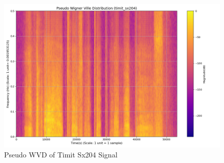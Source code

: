 \documentclass[12pt,a4paper,onecolumn]{exam}
\begin{document}
\begin{solution}
        \begin{figure}[H]
        \centering
        \includegraphics[scale = 0.35]{timit_sx204_pwvd.png}
        \caption{Pseudo WVD of Timit Sx204 Signal}
        \label{fig:56}
        \end{figure}      
  
\end{solution}
\end{document}
